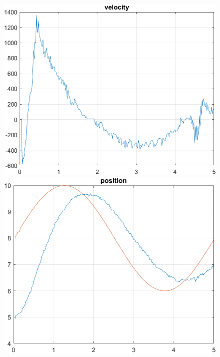 \begin{enumerate}
    \begin{figure}[H]
    \centering
    \begin{minipage}{0.45\textwidth}
        \includegraphics[width=\linewidth]{Images/lab2/4/2/vel2242.png}
    \end{minipage}
    \hfill
    \begin{minipage}{0.45\textwidth}
        \includegraphics[width=\linewidth]{Images/lab2/4/2/pos2242.png}
    \end{minipage}
    
    \vspace{0.5cm}
    

\end{figure}
\end{enumerate}
